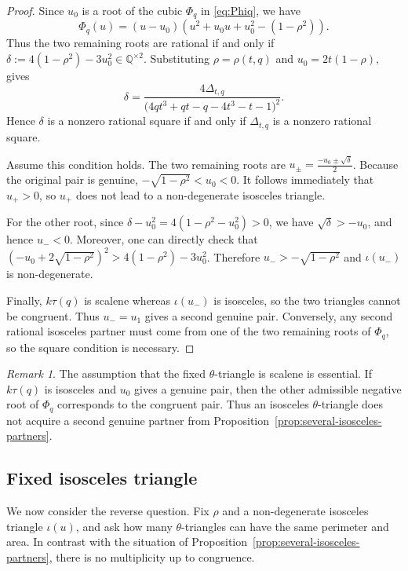 \documentclass[11pt]{amsart}
\theoremstyle{plain}
\theoremstyle{remark}
\newtheorem{rem}[thm]{Remark}
\theoremstyle{plain}
\newcommand{\Q}{\mathbb{Q}}
\begin{document}
\begin{proof}
Since $u_0$ is a root of the cubic $\Phi_q$ in
\eqref{eq:Phiq}, we have
\[
\Phi_q(u)
=
(u-u_0)
\left(
u^2+u_0u+u_0^2-(1-\rho^2)
\right).
\]
Thus the two remaining roots are rational if and only if
$\delta := 4(1-\rho^2)-3u_0^2 \in \Q^{\times 2}$.
Substituting
$\rho=\rho(t,q)$ and $
u_0=2t(1-\rho),
$ gives
\[
\delta
=
\frac{
4\Delta_{t,q}
}{
\bigl(4qt^3+qt-q-4t^3-t-1\bigr)^2
}.
\]
Hence $\delta$ is a nonzero rational square if and only if
$\Delta_{t,q}$ is a nonzero rational square.

Assume this condition holds. The two remaining roots are
$u_{\pm} = \frac{-u_0\pm\sqrt{\delta}}{2}$.
Because the original pair is genuine,
$-\sqrt{1-\rho^2}<u_0<0$.
It follows immediately that $u_+>0$, so $u_+$ does not lead to a non-degenerate isosceles triangle.

For the other root, since
$\delta-u_0^2 = 4(1-\rho^2-u_0^2)>0
$,  we have $\sqrt{\delta}>-u_0$, and hence $u_-<0$. Moreover, one can directly check that
$(-u_0+2\sqrt{1-\rho^2})^2>4(1-\rho^2)-3u_0^2$.
Therefore
$u_- >-\sqrt{1-\rho^2}$ and
$\iota(u_-)$ is non-degenerate.

Finally, $k\tau(q)$ is scalene whereas $\iota(u_-)$ is isosceles, so
the two triangles cannot be congruent. Thus $u_-=u_1$ gives a second
genuine pair. Conversely, any second rational isosceles partner must
come from one of the two remaining roots of $\Phi_q$, so the square
condition is necessary.
\end{proof}
\begin{rem}
The assumption that the fixed $\theta$-triangle is scalene is
essential. If $k\tau(q)$ is isosceles and $u_0$ gives a genuine pair, then the other
admissible negative root of $\Phi_q$ corresponds to the congruent pair.
Thus an
isosceles $\theta$-triangle does not acquire a second genuine partner
from Proposition~\ref{prop:several-isosceles-partners}.
\end{rem}

\subsection{Fixed isosceles triangle}

We now consider the reverse question. Fix $\rho$ and a non-degenerate isosceles triangle $\iota(u)$, and ask how many $\theta$-triangles can have the same perimeter and area. In contrast with the situation of Proposition~\ref{prop:several-isosceles-partners}, there is no multiplicity up to congruence.
\end{document}
